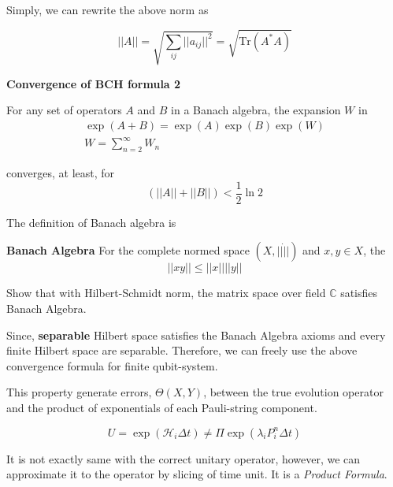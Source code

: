 Simply, we can rewrite the above norm as

\begin{equation}
    ||A|| = \sqrt{\sum_{i j} ||a_{ij}||^2} = \sqrt{\text{Tr} (A^\ast A)}
\end{equation}

\begin{theorem} \textbf{Convergence of BCH formula 2}
    \label{theorem:converges_BCH_2}
    
    For any set of operators $A$ and $B$ in a Banach algebra, the expansion $W$ in
    \begin{eqnarray}
        \exp(A + B) = \exp(A) \exp(B) \exp(W) \\
        W = \sum_{n=2}^\infty W_n
    \end{eqnarray}

    converges, at least, for
    \begin{equation}
        (||A|| + ||B||) < \frac{1}{2} \ln 2
    \end{equation}
\end{theorem}


\begin{exercise}
    The definition of Banach algebra is 
    \begin{definition}\textbf{Banach Algebra}
        For the complete normed space $(X, ||\dot||)$ and $x, y \in X$, the 
        \begin{equation*}
            ||xy || \leq ||x|| ||y||
        \end{equation*}
    \end{definition}

    Show that with Hilbert-Schmidt norm, the matrix space over field $\mathbb{C}$ 
    satisfies Banach Algebra.
\end{exercise}
Since, \textbf{separable} Hilbert space satisfies the Banach Algebra axioms and every finite Hilbert space are separable.
Therefore, we can freely use the above convergence formula for finite qubit-system.

This property generate errors, $\Theta(X, Y)$, between the true evolution operator 
and the product of exponentials of each Pauli-string component. 

\begin{equation}
    U = \exp(\mathcal{H}_i \Delta t) \neq \Pi \exp(\lambda_i P_i^n \Delta t)
\end{equation}

It is not exactly same with the correct unitary operator, 
however, we can approximate it to the operator by slicing of time unit.
It is a \textit{Product Formula}.

